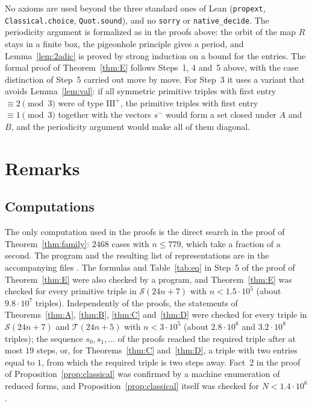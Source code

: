 \documentclass[11pt]{amsart}
\theoremstyle{definition}
\theoremstyle{remark}
\newcommand{\cS}{\mathcal{S}}
\newcommand{\cT}{\mathcal{T}}
\begin{document}
No axioms are used beyond the three standard ones of Lean (\texttt{propext}, \texttt{Classical.choice}, \texttt{Quot.sound}), and no \texttt{sorry} or \texttt{native\_decide}.
The periodicity argument is formalized as in the proofs above: the orbit of the map $R$ stays in a finite box, the pigeonhole principle gives a period,
and Lemma~\ref{lem:2adic} is proved by strong induction on a bound for the entries.
The formal proof of Theorem~\ref{thm:E} follows Steps~1, 4 and~5 above, with the case distinction of Step~5 carried out move by move.
For Step~3 it uses a variant that avoids Lemma~\ref{lem:val}: if all symmetric primitive triples with first entry $\equiv 2\pmod 3$ were of type $\mathrm{III}^+$,
the primitive triples with first entry $\equiv 1\pmod 3$ together with the vectors $s^-$ would form a set closed under $A$ and $B$, and the periodicity argument would make all of them diagonal.

\section{Remarks}\label{sec:remarks}

\subsection*{Computations}
The only computation used in the proofs is the direct search in the proof of Theorem~\ref{thm:family}:
$2468$ cases with $n\le 779$, which take a fraction of a second. The program and the resulting list of representations are in the accompanying files \cite{code}.
The formulas and Table~\ref{tab:eq} in Step~5 of the proof of Theorem~\ref{thm:E} were also checked by a program,
and Theorem~\ref{thm:E} was checked for every primitive triple in $\cS(24n+7)$ with $n<1.5\cdot 10^5$ (about $9.8\cdot 10^7$ triples).
Independently of the proofs, the statements of Theorems~\ref{thm:A}, \ref{thm:B}, \ref{thm:C} and~\ref{thm:D} were checked for every triple in
$\cS(24n+7)$ and $\cT(24n+5)$ with $n<3\cdot 10^5$ (about $2.8\cdot 10^8$ and $3.2\cdot 10^8$ triples);
the sequence $s_0,s_1,\dots$ of the proofs reached the required triple after at most $19$ steps,
or, for Theorems~\ref{thm:C} and~\ref{thm:D}, a triple with two entries equal to $1$, from which the required triple is two steps away.
Fact~2 in the proof of Proposition~\ref{prop:classical} was confirmed by a machine enumeration of reduced forms, and Proposition~\ref{prop:classical} itself was checked for $N<1.4\cdot 10^6$.
\end{document}
